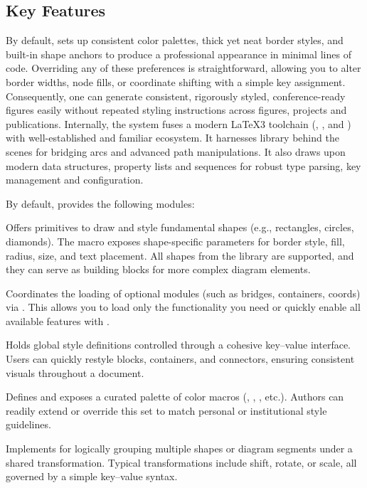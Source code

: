 \documentclass[show-experimental]{l3doc}
\begin{document}
\subsection{Key Features}

By default,  sets up consistent color palettes, thick yet neat border styles, and built-in shape anchors to produce a professional appearance in minimal lines of code. Overriding any of these preferences is straightforward, allowing you to alter border widths, node fills, or coordinate shifting with a simple key assignment. Consequently, one can generate consistent, rigorously styled, conference-ready figures easily without repeated styling instructions across figures, projects and publications. Internally, the system fuses a modern \LaTeX3 toolchain (, , and ) with well-established and familiar  ecosystem. It harnesses  library behind the scenes for bridging arcs and advanced path manipulations. It also draws upon  modern data structures, property lists and sequences for robust type parsing, key management and configuration.

\noindent By default,  provides the following modules:

 Offers primitives to draw and style fundamental shapes (e.g., rectangles, circles, diamonds). The  macro exposes shape-specific parameters for border style, fill, radius, size, and text placement. All shapes from the   library are supported, and they can serve as building blocks for more complex diagram elements.

 Coordinates the loading of optional modules (such as bridges, containers, coords) via . This allows you to load only the functionality you need or quickly enable all available features with \Arg{*}.

 Holds global style definitions controlled through a cohesive key–value interface. Users can quickly restyle blocks, containers, and connectors, ensuring consistent visuals throughout a document.

 Defines and exposes a curated palette of color macros (, , , etc.). Authors can readily extend or override this set to match personal or institutional style guidelines.

 Implements  for logically grouping multiple shapes or diagram segments under a shared transformation. Typical transformations include shift, rotate, or scale, all governed by a simple key–value syntax.
\end{document}
